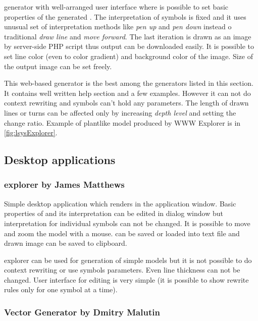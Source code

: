 \noindent
\lsystem generator with well-arranged user interface where is possible to set basic properties of the generated \lsystems.
The interpretation of symbols is fixed and it uses unusual set of interpretation methods like \emph{pen up} and \emph{pen down} instead o traditional \emph{draw line} and \emph{move forward}.
The last iteration is drawn as an image by server-side PHP  script thus output can be downloaded easily.
It is possible to set line color (even to color gradient) and background color of the image.
Size of the output image can be set freely.

This web-based generator is the best among the generators listed in this section.
It contains well written help section and a few examples.
However it can not do context rewriting and symbols can't hold any parameters.
The length of drawn lines or turns can be affected only by increasing \emph{depth level} and setting the change ratio.
Example of plantlike model produced by WWW \lsystem Explorer is in \autoref{fig:lsysExplorer}.




\subsection{Desktop applications}
\label{sec:DesktopGenerators}

\subsubsection{\lsystems explorer by James Matthews}
\label{sec:LsystemExplorer}

\noindent
Simple desktop application which renders \lsystems in the application window.
Basic properties of \lsystem and its interpretation can be edited in dialog window but interpretation for individual symbols can not be changed.
It is possible to move and zoom the model with a mouse.
\lsystems can be saved or loaded into text file and drawn image can be saved to clipboard.

\lsystems explorer can be used for generation of simple models but it is not possible to do context rewriting or use symbols parameters.
Even line thickness can not be changed.
User interface for editing \lsystem is very simple (it is possible to show rewrite rules only for one symbol at a time).


\subsubsection{\lsystem Vector Generator by Dmitry Malutin}

